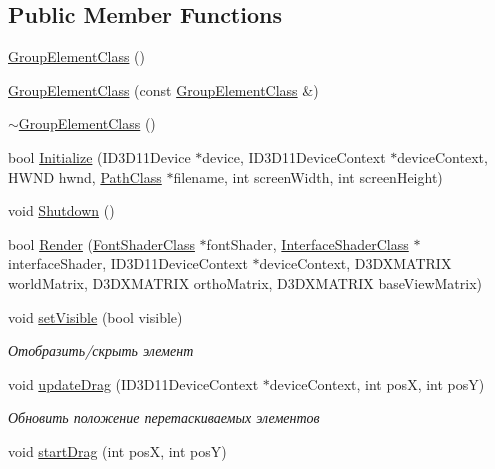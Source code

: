 \subsection*{Public Member Functions}
\begin{DoxyCompactItemize}
\item 
\hyperlink{class_group_element_class_a7ff4c0c7752c6648899d032d1c477cda}{Group\+Element\+Class} ()
\item 
\hyperlink{class_group_element_class_afdab87da678867d7918d97eff19bf68a}{Group\+Element\+Class} (const \hyperlink{class_group_element_class}{Group\+Element\+Class} \&)
\item 
\hyperlink{class_group_element_class_a0694ac39ce7bf7083b684dc1b57ab5c1}{$\sim$\+Group\+Element\+Class} ()
\item 
bool \hyperlink{class_group_element_class_ae24f5eb744d0e4d7354dc7b1f0fcaa57}{Initialize} (I\+D3\+D11\+Device $\ast$device, I\+D3\+D11\+Device\+Context $\ast$device\+Context, H\+W\+ND hwnd, \hyperlink{class_path_class}{Path\+Class} $\ast$filename, int screen\+Width, int screen\+Height)
\item 
void \hyperlink{class_group_element_class_add2c48701e28e7a05fbb0e5aa14e58a3}{Shutdown} ()
\item 
bool \hyperlink{class_group_element_class_ad4ff33d4a63c778c200177dbea7c18ce}{Render} (\hyperlink{class_font_shader_class}{Font\+Shader\+Class} $\ast$font\+Shader, \hyperlink{class_interface_shader_class}{Interface\+Shader\+Class} $\ast$interface\+Shader, I\+D3\+D11\+Device\+Context $\ast$device\+Context, D3\+D\+X\+M\+A\+T\+R\+IX world\+Matrix, D3\+D\+X\+M\+A\+T\+R\+IX ortho\+Matrix, D3\+D\+X\+M\+A\+T\+R\+IX base\+View\+Matrix)
\item 
void \hyperlink{class_group_element_class_af6aad54e794162fa3776fd849c644461}{set\+Visible} (bool visible)
\begin{DoxyCompactList}\small\item\em Отобразить/скрыть элемент \end{DoxyCompactList}\item 
void \hyperlink{class_group_element_class_a7363e5aee8dfc5a09b52aabea0f6ce44}{update\+Drag} (I\+D3\+D11\+Device\+Context $\ast$device\+Context, int posX, int posY)
\begin{DoxyCompactList}\small\item\em Обновить положение перетаскиваемых элементов \end{DoxyCompactList}\item 
void \hyperlink{class_group_element_class_ad278bfc85cfc469a37ba0292bc944504}{start\+Drag} (int posX, int posY)

\end{DoxyCompactItemize}
